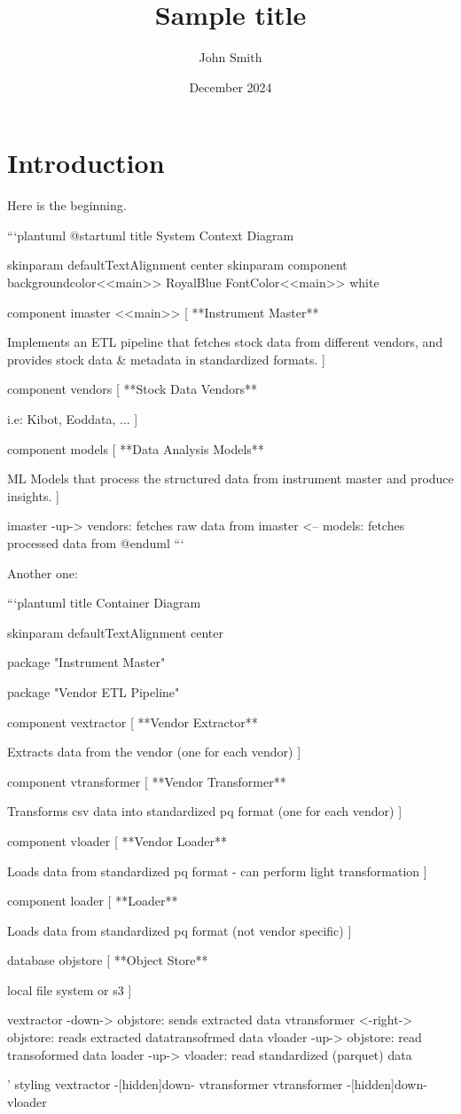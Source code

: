 \documentclass{article}
\title{Sample title}
\author{John Smith}
\date{December 2024}
\begin{document}
\maketitle

\section{Introduction}

Here is the beginning.

```plantuml
@startuml
title System Context Diagram

skinparam defaultTextAlignment center
skinparam component {
    backgroundcolor<<main>> RoyalBlue
    FontColor<<main>> white
}

component imaster <<main>> [
**Instrument Master**

Implements an ETL pipeline that fetches stock data from
different vendors, and provides stock data & metadata
in standardized formats.
]

component vendors [
**Stock Data Vendors**

i.e: Kibot, Eoddata, ...
]

component models [
**Data Analysis Models**

ML Models that process the structured data from instrument
master and produce insights.
]

imaster -up-> vendors: fetches raw data from
imaster <-- models: fetches processed data from
@enduml
```

Another one:

```plantuml
title Container Diagram

skinparam defaultTextAlignment center

package "Instrument Master" {
   package "Vendor ETL Pipeline" {
      component vextractor [
      **Vendor Extractor**

      Extracts data from the vendor
      (one for each vendor)
      ]

      component vtransformer [
      **Vendor Transformer**

      Transforms csv data into standardized pq format
      (one for each vendor)
      ]

      component vloader [
      **Vendor Loader**

      Loads data from standardized pq format
      - can perform light transformation
      ]

   }

    component loader [
    **Loader**

    Loads data from standardized pq format
    (not vendor specific)
    ]

    database objstore [
    **Object Store**

    local file system or s3
    ]

    vextractor -down-> objstore: sends extracted data
    vtransformer <-right-> objstore: reads extracted data\lwrite transofrmed data
    vloader -up-> objstore: read transoformed data
    loader -up-> vloader: read standardized (parquet) data

    ' styling
    vextractor -[hidden]down- vtransformer
    vtransformer -[hidden]down- vloader

}
\end{document}
